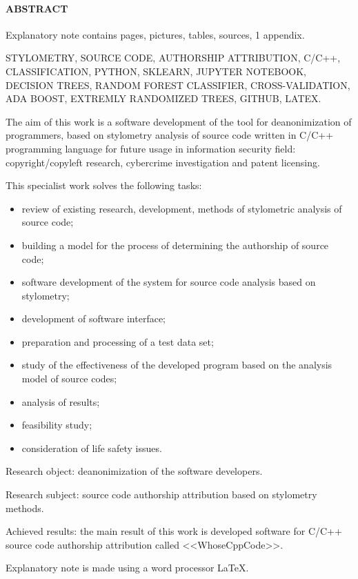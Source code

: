 \newpage
{}
\paragraph{\hfill ABSTRACT \hfill}
Explanatory note contains  pages,  pictures,  tables,
 sources, 1 appendix.

STYLOMETRY, SOURCE CODE, AUTHORSHIP ATTRIBUTION, C/C++, CLASSIFICATION, PYTHON, SKLEARN,
JUPYTER NOTEBOOK, DECISION TREES, RANDOM FOREST CLASSIFIER, CROSS-VALIDATION, 
ADA BOOST, EXTREMLY RANDOMIZED TREES, GITHUB, LATEX.

The aim of this work is a software development of the tool for deanonimization of programmers, 
based on stylometry analysis of source code written in C/C++ programming language for future
usage in information security field: copyright/copyleft research, cybercrime investigation and patent licensing.

This specialist work solves the following tasks:
\begin{itemize}
  \item review of existing research, development, methods of stylometric analysis of source code;
  \item building a model for the process of determining the authorship of source code;
  \item software development of the system for source code analysis based on stylometry;
  \item development of software interface;
  \item preparation and processing of a test data set;
  \item study of the effectiveness of the developed program based on the analysis model of source codes;
  \item analysis of results;
  \item feasibility study;
  \item consideration of life safety issues.
\end{itemize}

Research object: deanonimization of the software developers.

Research subject: source code authorship attribution based on stylometry methods.

Achieved results: the main result of this work is developed software for C/C++ source code 
authorship attribution called <<WhoseCppCode>>.

Explanatory note is made using a word processor \LaTeX.
